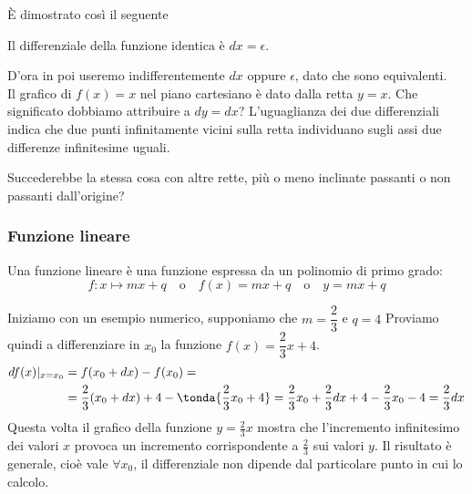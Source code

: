 \begin{inaccessibleblock}
 \begin{center}
 \begin{minipage}[]{.38 \textwidth}
  \rettabisettrice
 \end{minipage} 
 \hfill
 \begin{minipage}[]{.55 \textwidth}
È dimostrato così il seguente
\begin{teorema}
Il differenziale della funzione identica è $dx=\epsilon$.
\end{teorema}
D'ora in poi useremo indifferentemente $dx$ oppure $\epsilon$, dato che
sono equivalenti.\\
Il grafico di $f(x)=x$ nel piano cartesiano è dato dalla retta $y=x$. 
Che significato dobbiamo attribuire a $dy=dx$?
L'uguaglianza dei due differenziali indica che due punti infinitamente
vicini sulla retta individuano sugli assi due differenze infinitesime 
uguali.
 \end{minipage}
 \end{center}
\end{inaccessibleblock}
\label{fig:diff01_diffcostante}
  

Succederebbe la stessa cosa con altre rette, più o meno inclinate passanti o
non passanti dall'origine?

\subsubsection{Funzione lineare}
\label{subsubsec:diff01_flineare}

Una funzione lineare è una funzione espressa da un polinomio di primo grado:
\[f: x \mapsto mx +q \quad \text{o} \quad 
  f(x)=mx +q \quad \text{o} \quad 
  y = mx +q\]

\begin{esempio}
 Iniziamo con un esempio numerico, supponiamo 
 che \(m=\dfrac{2}{3}\) e \(q=4\)
 Proviamo quindi a differenziare in $x_0$ la 
 funzione $f(x)=\dfrac{2}{3}x +4$.
\begin{align*}
df(x)|_{x=x_0} &=f(x_0+dx)-f(x_0)=\\
               &=\frac{2}{3}(x_0+dx)+4-\tonda{\frac{2}{3}x_0+4}=
                 \frac{2}{3}x_0+\frac{2}{3}dx+4-\frac{2}{3}x_0-4=
                 \frac{2}{3}dx
\end{align*}
Questa volta il grafico della funzione $y=\frac{2}{3}x$ mostra che
l'incremento infinitesimo dei valori $x$ provoca un incremento 
corrispondente a $\frac{2}{3}$ sui valori $y$. 
Il risultato è generale, cioè vale $\forall x_0$, il differenziale non 
dipende dal particolare punto in cui lo calcolo.
\end{esempio}

